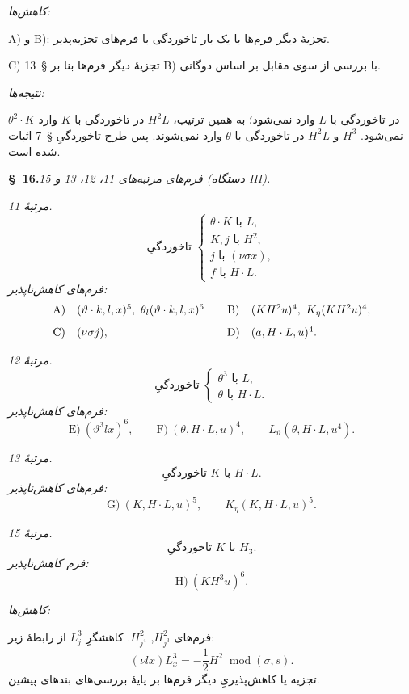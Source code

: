 \documentclass[11pt]{article}
\providecommand{\modu}[1]{\;\operatorname{mod} #1}
\begin{document}
\noindent\emph{کاهش‌ها:}

A) و B): تجزیهٔ دیگر فرم‌ها با یک بار تاخوردگی با فرم‌های تجزیه‌پذیر.

C) تجزیهٔ دیگر فرم‌ها بنا بر \S\ 13 B) با بررسی از سوی مقابل بر اساس دوگانی.

\noindent\emph{نتیجه‌ها:}

$\theta^2\cdot K$ در تاخوردگی با $L$ وارد نمی‌شود؛ به همین ترتیب، $H^2L$ در تاخوردگی با $K$ وارد نمی‌شود. $H^3$ و $H^2L$ در تاخوردگی با $\theta$ وارد نمی‌شوند. پس طرح تاخوردگیِ \S\ 7 اثبات شده است.

\begin{center}
\textbf{\S\ 16.}\quad\emph{فرم‌های مرتبه‌های 11، 12، 13 و 15 (دستگاه III).}
\end{center}

\noindent\emph{مرتبهٔ 11.}
\[
\text{تاخوردگیِ }\left\{\begin{array}{l}
\theta\cdot K\text{ با }L,\\
K,j\text{ با }H^2,\\
j\text{ با }(\nu\sigma x),\\
f\text{ با }H\cdot L.
\end{array}\right.
\]
\noindent\emph{فرم‌های کاهش‌ناپذیر:}
\[
\begin{array}{c@{\quad}l@{\qquad}c@{\quad}l}
\text{A)}&(\vartheta\cdot k,l,x)^5,
\ \theta_l(\vartheta\cdot k,l,x)^5&
\text{B)}&(KH^2u)^4,
\ K_\eta(KH^2u)^4,\\[0.8em]
\text{C)}&(\nu\sigma j),&
\text{D)}&(a,H\cdot L,u)^4.
\end{array}
\]

\noindent\emph{مرتبهٔ 12.}
\[
\text{تاخوردگیِ }\left\{\begin{array}{l}
\theta^3\text{ با }L,\\
\theta\text{ با }H\cdot L.
\end{array}\right.
\]
\noindent\emph{فرم‌های کاهش‌ناپذیر:}
\[
\text{E)}\ (\vartheta^3lx)^6,
\qquad
\text{F)}\ (\theta,H\cdot L,u)^4,
\qquad L_\vartheta(\theta,H\cdot L,u^4).
\]

\noindent\emph{مرتبهٔ 13.}
\[
\text{تاخوردگیِ }K\text{ با }H\cdot L.
\]
\noindent\emph{فرم‌های کاهش‌ناپذیر:}
\[
\text{G)}\ (K,H\cdot L,u)^5,
\qquad K_\eta(K,H\cdot L,u)^5.
\]

\noindent\emph{مرتبهٔ 15.}
\[
\text{تاخوردگیِ }K\text{ با }H_3.
\]
\noindent\emph{فرم کاهش‌ناپذیر:}
\[
\text{H)}\ (KH^3u)^6.
\]

\noindent\emph{کاهش‌ها:}

فرم‌های $H_{j^3}^2$, $H_{j^4}^2$. کاهشگرِ $L_j^3$ از رابطهٔ زیر:
\[
(\nu lx)L_x^3=-\frac12H^2\modu{(\sigma,s)}.
\]
تجزیه یا کاهش‌پذیریِ دیگر فرم‌ها بر پایهٔ بررسی‌های بندهای پیشین.
\end{document}
